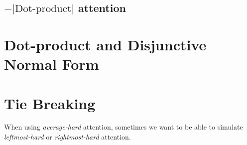 \citep{barcelo-etal-2024-logical}

\subsection{$-|\text{Dot-product}|$ attention}

\citep{perez-etal-2021-turing}

\section{Dot-product and Disjunctive Normal Form}
\label{sec:att_dnf}

\section{Tie Breaking}

When using \emph{average-hard} attention, sometimes we want to be able to simulate \emph{leftmost-hard} or \emph{rightmost-hard} attention.
